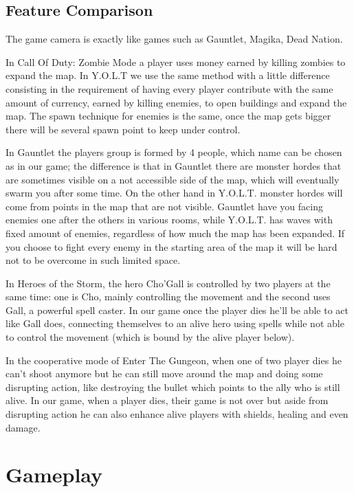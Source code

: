 \documentclass[12pt]{article}
\begin{document}
\subsection{Feature Comparison}

The game camera is exactly like games such as Gauntlet, Magika, Dead Nation.

In Call Of Duty: Zombie Mode a player uses money earned by killing zombies to expand the map. In Y.O.L.T we use the same method with a little difference consisting in the requirement of having every player contribute with the same amount of currency, earned by killing enemies, to open buildings and expand the map. The spawn technique for enemies is the same, once the map gets bigger there will be several spawn point to keep under control.

In Gauntlet the players group is formed by 4 people, which name can be chosen as in our game; the difference is that in Gauntlet there are monster hordes that are sometimes visible on a not accessible side of the map, which will eventually swarm you after some time. On the other hand in Y.O.L.T. monster hordes will come from points in the map that are not visible. Gauntlet have you facing enemies one after the others in various rooms, while Y.O.L.T. has waves with fixed amount of enemies, regardless of how much the map has been expanded. If you choose to fight every enemy in the starting area of the map it will be hard not to be overcome in such limited space. 

In Heroes of the Storm, the hero Cho’Gall is controlled by two players at the same time: one is Cho, mainly controlling the movement and the second uses Gall, a powerful spell caster. In our game once the player dies he’ll be able to act like Gall does, connecting themselves to an alive hero using spells while not able to control the movement (which is bound by the alive player below).

In the cooperative mode of Enter The Gungeon, when one of two player dies he can’t shoot anymore but he can still move around the map and doing some disrupting action, like destroying the bullet which points to the ally who is still alive. In our game, when a player dies, their game is not over but aside from disrupting action he can also enhance alive players with shields, healing and even damage.

\newpage

\section{Gameplay}
\end{document}
